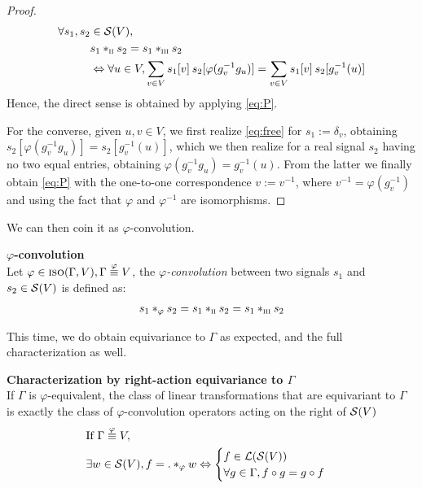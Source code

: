\begin{proof}
\begin{align}
\forall s_1, s_2 & \in \cs(V),\nonumber\\
& s_1 \ast_{\II} s_2 = s_1 \ast_{\III} s_2 \nonumber\\
& \Leftrightarrow \forall u \in V,
\displaystyle \sum_{v \in V} s_1[v] \h{2} s_2[\varphi(g_v^{-1}g_u)] = \displaystyle \sum_{v \in V} s_1[v] \h{2} s_2[g_v^{-1}(u)] \label{eq:free}
\end{align}
Hence, the direct sense is obtained by applying \eqref{eq:P}. 

For the converse, given $u, v \in V$, we first realize \eqref{eq:free} for $s_1 := \delta_v$, obtaining $s_2[\varphi(g_v^{-1}g_u)] = s_2[g_v^{-1}(u)]$, which we then realize for a real signal $s_2$ having no two equal entries, obtaining $\varphi(g_v^{-1}g_u) = g_v^{-1}(u)$. From the latter we finally obtain \eqref{eq:P} with the one-to-one correspondence $v := v^{-1}$, where $v^{-1} = \varphi(g_v^{-1})$ and using the fact that $\varphi$ and $\varphi^{-1}$ are isomorphisms.
\end{proof}

We can then coin it as $\varphi$-convolution.

\begin{definition}\textbf{$\varphi$-convolution}\\
Let $\varphi \in \iso(\Gamma, V), \Gamma \overset{\varphi}{\equiv} V$, the \emph{$\varphi$-convolution} between two signals $s_1$ and $s_2 \in \cs(V)$ is defined as:
\begin{align*}
s_1 \ast_{\varphi} s_2 = s_1 \ast_{\II} s_2 = s_1 \ast_{\III} s_2
\end{align*}
\end{definition}

This time, we do obtain equivariance to $\Gamma$ as expected, and the full characterization as well.

\begin{proposition}\textbf{Characterization by right-action equivariance to $\Gamma$}\\
If $\Gamma$ is $\varphi$-equivalent, the class of linear transformations that are equivariant to $\Gamma$ is exactly the class of $\varphi$-convolution operators acting on the right of $\cs(V)$ \ie
\begin{align*}
& \text{If } \Gamma \overset{\varphi}{\equiv} V,\\
& \exists w \in \cs(V), f = . \ast_{\varphi} w \Leftrightarrow
\begin{cases}
f \in \cl(\cs(V))\\
\forall g \in \Gamma, f \circ g = g \circ f
\end{cases}
\end{align*}
\label{prop:equiG}
\end{proposition}

